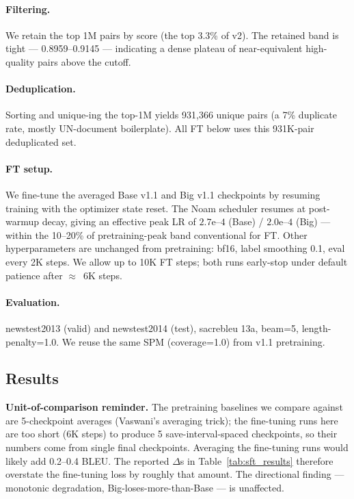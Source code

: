 \paragraph{Filtering.} We retain the top 1M pairs by score (the top 3.3\% of v2). The retained band is tight --- 0.8959--0.9145 --- indicating a dense plateau of near-equivalent high-quality pairs above the cutoff.

\paragraph{Deduplication.} Sorting and unique-ing the top-1M yields 931{,}366 unique pairs (a 7\% duplicate rate, mostly UN-document boilerplate). All FT below uses this 931K-pair deduplicated set.

\paragraph{FT setup.} We fine-tune the averaged Base v1.1 and Big v1.1 checkpoints by resuming training with the optimizer state reset. The Noam scheduler resumes at post-warmup decay, giving an effective peak LR of $2.7\text{e--}4$ (Base) / $2.0\text{e--}4$ (Big) --- within the 10--20\% of pretraining-peak band conventional for FT. Other hyperparameters are unchanged from pretraining: bf16, label smoothing 0.1, eval every 2K steps. We allow up to 10K FT steps; both runs early-stop under default patience after $\approx$~6K steps.

\paragraph{Evaluation.} newstest2013 (valid) and newstest2014 (test), sacrebleu 13a, beam=5, length-penalty=1.0. We reuse the same SPM (coverage=1.0) from v1.1 pretraining.

\subsection{Results}
\label{sec:sft_results}

\textbf{Unit-of-comparison reminder.} The pretraining baselines we compare against are 5-checkpoint averages (Vaswani's averaging trick); the fine-tuning runs here are too short (6K steps) to produce 5 save-interval-spaced checkpoints, so their numbers come from single final checkpoints. Averaging the fine-tuning runs would likely add 0.2--0.4 BLEU. The reported $\Delta$s in Table~\ref{tab:sft_results} therefore overstate the fine-tuning loss by roughly that amount. The directional finding --- monotonic degradation, Big-loses-more-than-Base --- is unaffected.

